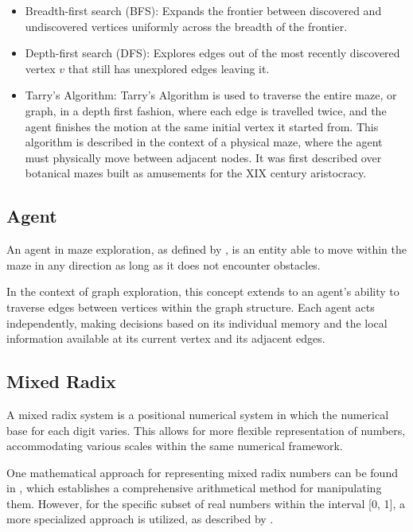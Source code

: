 \begin{itemize}
    \item Breadth-first search (BFS): Expands the frontier between discovered and undiscovered vertices uniformly across the breadth of the frontier. \cite{Manber1989}
    \item Depth-first search (DFS): Explores edges out of the most recently discovered vertex $v$ that still has unexplored edges leaving it. \cite{Manber1989}
    \item Tarry's Algorithm: Tarry's Algorithm is used to traverse the entire maze, or graph, in a depth first fashion, where each edge is travelled twice, and the agent finishes the motion at the same initial vertex it started from.\cite{Kivelevitch2010} This algorithm is described in the context of a physical maze, where the agent must physically move between adjacent nodes.
    It was first described over botanical mazes built as amusements for the XIX century aristocracy.
\end{itemize}

\subsection{Agent}
\label{section_definitions_agent}

An agent in maze exploration, as defined by , 
is an entity able to move within the maze in any direction as long as it does not encounter obstacles.

In the context of graph exploration, this concept extends to an agent's ability to traverse
edges between vertices within the graph structure. Each agent acts independently,
making decisions based on its individual memory and the local information available at its current vertex and its adjacent edges.


\subsection{Mixed Radix}
\label{section_definitions_mixed_radix}

A mixed radix system is a positional numerical system in which the numerical base for each digit
varies. This allows for more flexible representation of numbers,
accommodating various scales within the same numerical framework.

One mathematical approach for representing mixed radix numbers can be found in ,
which establishes a comprehensive arithmetical method for manipulating them.  However,
for the specific subset of real numbers within the interval [0, 1], a more specialized approach is utilized, as described by .

